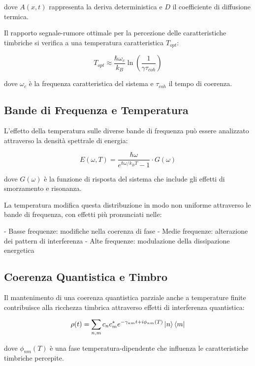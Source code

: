 \documentclass[a4paper,11pt]{article}
\begin{document}
dove $A(x,t)$ rappresenta la deriva deterministica e $D$ il coefficiente
di diffusione termica.

Il rapporto segnale-rumore ottimale per la percezione delle
caratteristiche timbriche si verifica a una temperatura caratteristica
$T_{opt}$:

\begin{equation}
T_{opt} \approx \frac{\hbar\omega_c}{k_B}\ln\left(\frac{1}{\gamma\tau_{coh}}\right)
\end{equation}


dove $\omega_c$ è la frequenza caratteristica del sistema e $\tau_{coh}$
il tempo di coerenza.

\subsection{Bande di Frequenza e Temperatura}

L'effetto della temperatura sulle diverse bande di frequenza può essere
analizzato attraverso la densità spettrale di energia:

\begin{equation}
E(\omega, T) = \frac{\hbar\omega}{e^{\hbar\omega/k_BT} - 1} \cdot G(\omega)
\end{equation}


dove $G(\omega)$ è la funzione di risposta del sistema che include gli
effetti di smorzamento e risonanza.

La temperatura modifica questa distribuzione in modo non uniforme
attraverso le bande di frequenza, con effetti più pronunciati nelle:

- Basse frequenze: modifiche nella coerenza di fase
- Medie frequenze: alterazione dei pattern di interferenza
- Alte frequenze: modulazione della dissipazione energetica

\subsection{Coerenza Quantistica e Timbro}

Il mantenimento di una coerenza quantistica parziale anche a temperature
finite contribuisce alla ricchezza timbrica attraverso effetti di
interferenza quantistica:

\begin{equation}
\rho(t) = \sum_{n,m} c_n c_m^* e^{-\gamma_{nm}t + i\phi_{nm}(T)} \ket{n}\bra{m}
\end{equation}


dove $\phi_{nm}(T)$ è una fase temperatura-dipendente che influenza le
caratteristiche timbriche percepite.
\end{document}
